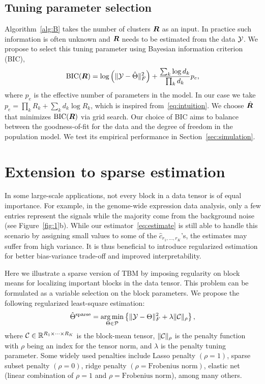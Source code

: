 \documentclass[11pt]{article}
\theoremstyle{plain}
\theoremstyle{definition}
\begin{document}
\subsection{Tuning parameter selection}\label{sec:tuning}

Algorithm~\ref{alg:B} takes the number of clusters $\bm{R}$ as an input. In practice such information is often unknown and $\bm{R}$ needs to be estimated from the data $\mathcal{Y}$. We propose to select this tuning parameter using Bayesian information criterion (BIC), 
\begin{equation}\label{eq:BIC}
\text{BIC}(\bm{R}) =  \log\left(\lVert\mathcal{Y}-\hat \Theta\rVert_F^2\right)+{ \sum_k \log d_k \over \prod_k d_k}p_e,
\end{equation}
where $p_e$ is the effective number of parameters in the model. In our case we take $p_e=\prod_k R_k+\sum_k d_k\log R_k$, which is inspired from~\eqref{eq:intuition}. We choose $\hat {\bm{R}}$ that minimizes $\text{BIC}(\bm{R})$ via grid search. Our choice of BIC aims to balance between the goodness-of-fit for the data and the degree of freedom in the population model. We test its empirical performance in Section~\ref{sec:simulation}.  


\section{Extension to sparse estimation}\label{block}

In some large-scale applications, not every block in a data tensor is of equal importance. For example, in the genome-wide expression data analysis, only a few entries represent the signals while the majority come from the background noise (see Figure~\ref{fig:1}b). %
While our estimator~\eqref{eq:estimate} is still able to handle this scenario by assigning small values to some of the $\hat c_{r_1,\ldots,r_K}$'s, the estimates may suffer from high variance. It is thus beneficial to introduce regularized estimation for better bias-variance trade-off and improved interpretability. 

Here we illustrate a sparse version of TBM by imposing regularity on block means for localizing important blocks in the data tensor. This problem can be formulated as a variable selection on the block parameters. We propose the following regularized least-square estimation:
\[
\hat \Theta^{\text{sparse}}=\operatorname*{arg\,min}_{\Theta\in \mathcal{P}}\left\{\lVert\mathcal{Y}-\Theta\rVert_F^2+\lambda \lVert\mathcal{C}\rVert_\rho
\right\},
\]
where $\mathcal{C}\in\mathbb{R}^{R_1\times \cdots\times R_K}$ is the block-mean tensor, $\lVert\mathcal{C}\rVert_\rho$ is the penalty function with $\rho$ being an index for the tensor norm, and $\lambda$ is the penalty tuning parameter. Some widely used penalties include Lasso penalty $(\rho=1)$, sparse subset penalty $(\rho=0)$, ridge penalty $(\rho=\text{Frobenius norm})$, elastic net (linear combination of $\rho=1$ and $\rho=\text{Frobenius norm}$), among many others. 
\end{document}
